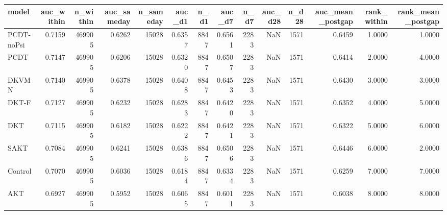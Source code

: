 \begin{tabular}{lrrrrrrrrrrrrr}
\toprule
model & auc\_within & n\_within & auc\_sameday & n\_sameday & auc\_d1 & n\_d1 & auc\_d7 & n\_d7 & auc\_d28 & n\_d28 & auc\_mean\_postgap & rank\_within & rank\_mean\_postgap \\
\midrule
PCDT-noPsi & 0.7159 & 469905 & 0.6262 & 15028 & 0.6357 & 8847 & 0.6561 & 2283 & NaN & 1571 & 0.6459 & 1.0000 & 1.0000 \\
PCDT & 0.7147 & 469905 & 0.6206 & 15028 & 0.6320 & 8847 & 0.6507 & 2283 & NaN & 1571 & 0.6414 & 2.0000 & 4.0000 \\
DKVMN & 0.7140 & 469905 & 0.6378 & 15028 & 0.6408 & 8847 & 0.6453 & 2283 & NaN & 1571 & 0.6430 & 3.0000 & 3.0000 \\
DKT-F & 0.7127 & 469905 & 0.6232 & 15028 & 0.6283 & 8847 & 0.6420 & 2283 & NaN & 1571 & 0.6352 & 4.0000 & 5.0000 \\
DKT & 0.7115 & 469905 & 0.6182 & 15028 & 0.6222 & 8847 & 0.6421 & 2283 & NaN & 1571 & 0.6322 & 5.0000 & 6.0000 \\
SAKT & 0.7084 & 469905 & 0.6241 & 15028 & 0.6386 & 8847 & 0.6506 & 2283 & NaN & 1571 & 0.6446 & 6.0000 & 2.0000 \\
Control & 0.7070 & 469905 & 0.6036 & 15028 & 0.6184 & 8847 & 0.6334 & 2283 & NaN & 1571 & 0.6259 & 7.0000 & 7.0000 \\
AKT & 0.6927 & 469905 & 0.5952 & 15028 & 0.6065 & 8847 & 0.6011 & 2283 & NaN & 1571 & 0.6038 & 8.0000 & 8.0000 \\
\bottomrule
\end{tabular}
